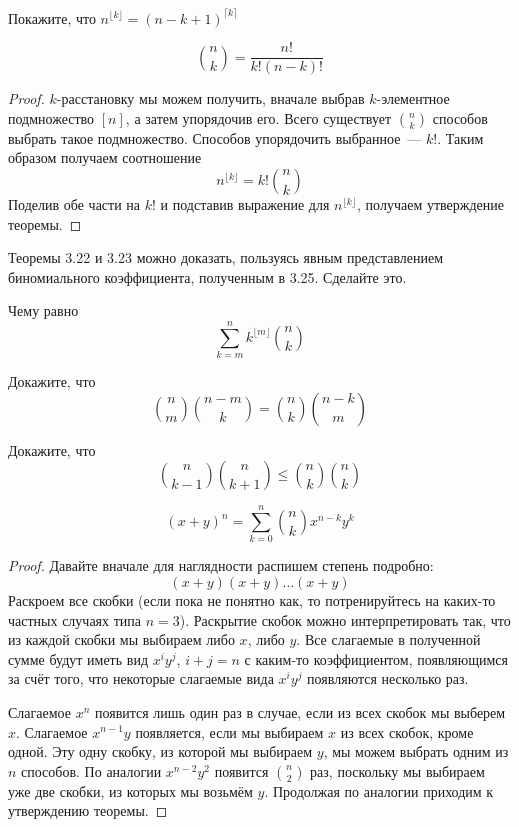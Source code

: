 \begin{exercise}
Покажите, что $n^{\lfloor k \rfloor} = (n-k+1)^{\lceil k \rceil}$
\end{exercise}

\begin{thm}
$${n \choose k} = \frac{n!}{k!(n-k)!}$$
\end{thm}
\begin{proof}
$k$-расстановку мы можем получить, вначале выбрав $k$-элементное подмножество $[n]$, а затем упорядочив его. Всего существует $n\choose k$ способов выбрать такое подмножество. Способов упорядочить выбранное~--- $k!$. Таким образом получаем соотношение
$$n^{\lfloor k \rfloor} = k!{n\choose k}$$
Поделив обе части на $k!$ и подставив выражение для $n^{\lfloor k \rfloor}$, получаем утверждение теоремы.
\end{proof}

\begin{exercise}
Теоремы 3.22 и 3.23 можно доказать, пользуясь явным представлением биномиального коэффициента, полученным в 3.25. Сделайте это.
\end{exercise}

\begin{exercise}
Чему равно $$\sum_{k=m}^n k^{\lfloor m\rfloor} {n\choose k}$$
\end{exercise}

\begin{exercise}
Докажите, что $${n\choose m}{n-m\choose k} = {n\choose k}{n-k\choose m}$$
\end{exercise}

\begin{exercise}
Докажите, что $${n\choose k-1}{n\choose k+1} \le {n\choose k}{n\choose k}$$
\end{exercise}

\begin{thm}
$$(x+y)^n = \sum_{k=0}^n {n \choose k} x^{n-k} y^k$$
\end{thm}
\begin{proof}
Давайте вначале для наглядности распишем степень подробно:
$$(x+y)(x+y)\ldots(x+y)$$
Раскроем все скобки (если пока не понятно как, то потренируйтесь на каких-то частных случаях типа $n=3$). Раскрытие скобок можно интерпретировать так, что из каждой скобки мы выбираем либо $x$, либо $y$. Все слагаемые в полученной сумме будут иметь вид $x^iy^j$, $i+j=n$ с каким-то коэффициентом, появляющимся за счёт того, что некоторые слагаемые вида $x^iy^j$ появляются несколько раз.

Слагаемое $x^n$ появится лишь один раз в случае, если из всех скобок мы выберем $x$. Слагаемое $x^{n-1}y$ появляется, если мы выбираем $x$ из всех скобок, кроме одной. Эту одну скобку, из которой мы выбираем $y$, мы можем выбрать одним из $n$ способов. По аналогии $x^{n-2}y^2$ появится $n\choose 2$ раз, поскольку мы выбираем уже две скобки, из которых мы возьмём $y$. Продолжая по аналогии приходим к утверждению теоремы.
\end{proof}


